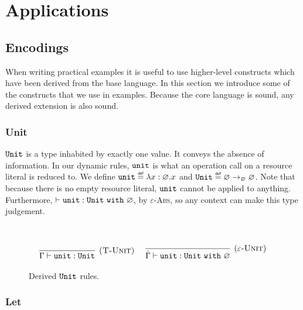 
\chapter{Applications}

\section{Encodings}

When writing practical examples it is useful to use higher-level constructs which have been derived from the base language. In this section we introduce some of the constructs that we use in examples. Because the core language is sound, any derived extension is also sound.

\subsection{Unit}

$\mathtt{Unit}$ is a type inhabited by exactly one value. It conveys the absence of information. In our dynamic rules, $\mathtt{unit}$ is what an operation call on a resource literal is reduced to. We define $\kwa{unit} \defn \lambda x: \varnothing. x$ and $\kwa{Unit} \defn \varnothing \rightarrow_{\varnothing} \varnothing$. Note that because there is no empty resource literal, $\mathtt{unit}$ cannot be applied to anything. Furthermore, $\vdash \mathtt{unit} : \mathtt{Unit}~\mathtt{with}~ \varnothing$, by \textsc{$\varepsilon$-Abs}, so any context can make this type judgement.



\begin{figure}[h]


 \\


\[
\begin{array}{c}

\infer[\textsc{(T-Unit)}]
	{\Gamma \vdash \unit : \Unit}
	{} ~~~~

\infer[(\textsc{$\varepsilon$-Unit})]
	{\hat \Gamma \vdash \unit : \Unit~\kw{with} \varnothing}
	{}

\end{array}
\]

	
\caption{Derived $\mathtt{Unit}$ rules.}
\label{This is the label.}
\end{figure}

\subsection{Let}

